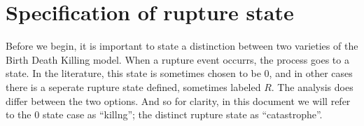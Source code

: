\section{Specification of rupture state}
Before we begin, it is important to state a distinction between two varieties of the Birth Death Killing model.
When a rupture event occurrs, the process goes to a state. In the literature, this state is sometimes chosen to be 0, and in other cases there is a seperate rupture state defined, sometimes labeled $R$. The analysis does differ between the two options. And so for clarity, in this document we will refer to the 0 state case as ``killng''; the distinct rupture state as ``catastrophe''.
